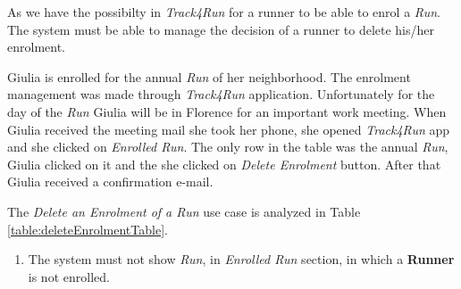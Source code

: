 As we have the possibilty in \textit{Track4Run} for a runner to be able to enrol a \textit{Run}. The system must be able to manage the decision of a runner to delete his/her enrolment.

Giulia is enrolled for the annual \textit{Run} of her neighborhood. The enrolment management was made through \textit{Track4Run} application. Unfortunately for the day of the \textit{Run} Giulia will be in Florence for an important work meeting.
When Giulia received the meeting mail she took her phone, she opened \textit{Track4Run} app and she clicked on \textit{Enrolled Run}.
The only row in the table was the annual \textit{Run}, Giulia clicked on it and the she clicked on \textit{Delete Enrolment} button.
After that Giulia received a confirmation e-mail.

The \textit{Delete an Enrolment of a Run} use case is analyzed in Table \ref{table:deleteEnrolmentTable}.

\begin{enumerate}
  \item The system must not show \textit{Run}, in \textit{Enrolled Run} section, in which a \textbf{Runner} is not enrolled.
\end{enumerate}

